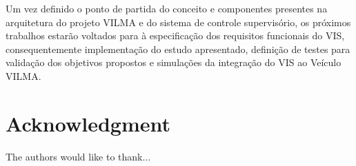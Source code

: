 \documentclass[conference]{IEEEtran}
\begin{document}
Um vez definido o ponto de partida do conceito e componentes presentes na arquitetura do projeto VILMA e do sistema de controle supervisório, os próximos trabalhos estarão voltados para à especificação dos requisitos funcionais do VIS, consequentemente implementação do estudo apresentado, definição de testes para validação dos objetivos propostos e simulações da integração do VIS ao Veículo VILMA.


\section*{Acknowledgment}\label{sec:acknowledgment}

The authors would like to thank...




%
%
%
\end{document}
